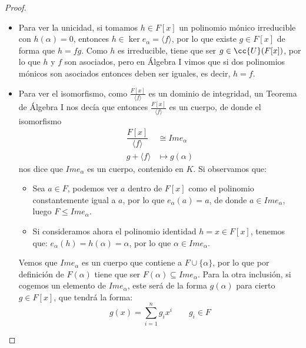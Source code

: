 \begin{prop}
\begin{proof}
\begin{itemize}
\begin{equation*}
                \end{equation*}
                Donde $Im e_{\alpha}$ será un subanillo de $K$, que es un dominio de integridad por ser $K$ un cuerpo, de donde $\frac{F[x]}{\langle f \rangle }$ es un dominio de integridad también, luego por un teorema visto en Álgebra I deducimos que $f$ tiene que ser irreducible.
            \item Para ver la unicidad, si tomamos $h\in F[x]$ un polinomio mónico irreducible con $h(\alpha)=0$, entonces $h\in \ker e_\alpha = \langle f \rangle $, por lo que existe $g\in F[x]$ de forma que $h = fg$. Como $h$ es irreducible, tiene que ser $g\in \cc{U}(F[x])$, por lo que $h$ y $f$ son asociados, pero en Álgebra I vimos que si dos polinomios mónicos son asociados entonces deben ser iguales, es decir, $h = f$.
            \item Para ver el isomorfismo, como $\frac{F[x]}{\langle f \rangle }$ es un dominio de integridad, un Teorema de Álgebra I nos decía que entonces $\frac{F[x]}{\langle f \rangle }$ es un cuerpo, de donde el isomorfismo
                \begin{align*}
                    \dfrac{F[x]}{\langle f \rangle }&\cong Im e_\alpha  \\
                    g+\langle f \rangle  &\mapsto g(\alpha)
                \end{align*}
                nos dice que $Im e_\alpha$ es un cuerpo, contenido en $K$. Si observamos que:
                \begin{itemize}
                    \item Sea $a\in F$, podemos ver $a$ dentro de $F[x]$ como el polinomio constantemente igual a $a$, por lo que $e_\alpha(a) = a$, de donde $a\in Im e_\alpha$, luego $F\leq Im e_\alpha$.
                    \item Si consideramos ahora el polinomio identidad $h=x\in F[x]$, tenemos que: $e_\alpha(h) = h(\alpha) = \alpha$, por lo que $\alpha\in Im e_\alpha$.
                \end{itemize}
                Vemos que $Im e_\alpha$ es un cuerpo que contiene a $F\cup \{\alpha\}$, por lo que por definición de $F(\alpha)$ tiene que ser $F(\alpha) \subseteq Im e_\alpha$. Para la otra inclusión, si cogemos un elemento de $Im e_\alpha$, este será de la forma $g(\alpha)$ para cierto $g\in F[x]$, que tendrá la forma:
                \begin{equation*}
                    g(x) = \sum_{i=1}^{n} g_i x^i\qquad g_i \in F
                \end{equation*}

\end{itemize}
\end{proof}
\end{prop}
